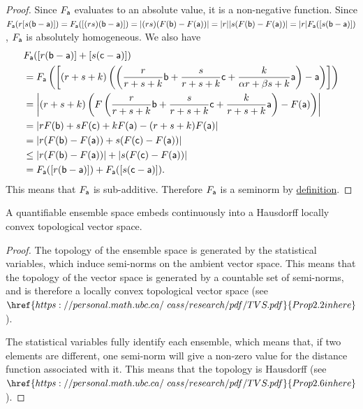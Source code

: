 \begin{proof}
	Since $F_{\ens[a]}$ evaluates to an absolute value, it is a non-negative function. Since $F_{\ens[a]}(r[s(\ens[b]-\ens[a])]) = F_{\ens[a]}([(rs)(\ens[b]-\ens[a])]) = |(rs) (F(\ens[b]) - F(\ens[a]))| = |r| |s (F(\ens[b]) - F(\ens[a]))| = |r| F_{\ens[a]}([s(\ens[b]-\ens[a])])$, $F_{\ens[a]}$ is absolutely homogeneous. We also have
	\begin{equation}
	\begin{aligned}
		&F_{\ens[a]}([r(\ens[b]-\ens[a])] + [s(\ens[c]-\ens[a])])  \\
		&= F_{\ens[a]}\left(\left[(r+s+k) \left(\left(\frac{r}{r+s+k}\ens[b] + \frac{s}{r+s+k} \ens[c] +\frac{k}{\alpha r+ \beta s+k} \ens[a] \right) - \ens[a]\right)\right]\right) \\
		&= \left|(r+s+k)\left(F\left(\frac{r}{r+s+k}\ens[b] + \frac{s}{r+s+k} \ens[c] +\frac{k}{r+s+k} \ens[a]\right) - F(\ens[a]) \right)\right| \\
		&= \left|r F(\ens[b]) + s F(\ens[c]) + k F(\ens[a]) - (r+s+k) F(\ens[a]) \right| \\
		&= \left|r ( F(\ens[b]) - F(\ens[a]))  + s ( F(\ens[c]) - F(\ens[a])) \right| \\
		&\leq \left| r ( F(\ens[b]) - F(\ens[a])) \right| + \left| s ( F(\ens[c]) - F(\ens[a])) \right| \\
		&= F_{\ens[a]}([r(\ens[b]-\ens[a])]) + F_{\ens[a]}([s(\ens[c]-\ens[a])]).
	\end{aligned}
	\end{equation}
	This means that $F_{\ens[a]}$ is sub-additive. Therefore $F_{\ens[a]}$ is a seminorm by \href{https://en.wikipedia.org/wiki/Seminorm}{definition}.
\end{proof}

\begin{prop}
	A quantifiable ensemble space embeds continuously into a Hausdorff locally convex topological vector space.
\end{prop}

\begin{proof}
	The topology of the ensemble space is generated by the statistical variables, which induce semi-norms on the ambient vector space. This means that the topology of the vector space is generated by a countable set of semi-norms, and is therefore a locally convex topological vector space (see $\href{https://personal.math.ubc.ca/~cass/research/pdf/TVS.pdf}{Prop 2.2 in here}$).
	
	The statistical variables fully identify each ensemble, which means that, if two elements are different, one semi-norm will give a non-zero value for the distance function associated with it. This means that the topology is Hausdorff (see $\href{https://personal.math.ubc.ca/~cass/research/pdf/TVS.pdf}{Prop 2.6 in here}$).
\end{proof}

